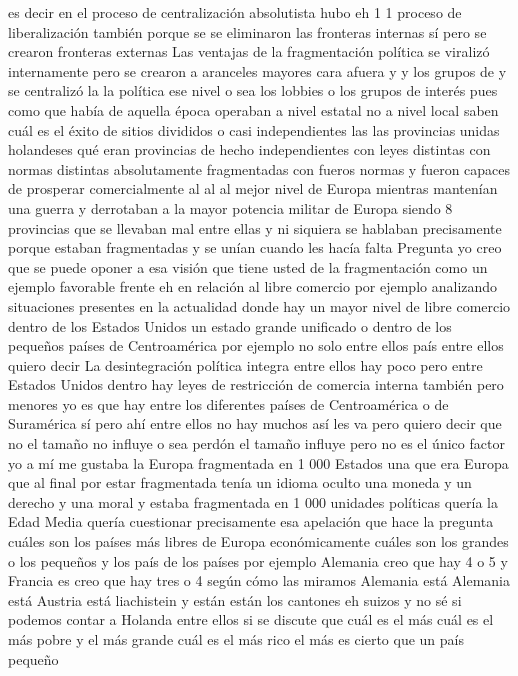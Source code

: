 es decir en el proceso de centralización absolutista hubo eh 1 1 proceso de liberalización también
porque se se eliminaron las fronteras internas sí pero se crearon fronteras externas
Las ventajas de la fragmentación política
se viralizó internamente pero se crearon a aranceles mayores cara afuera y y los grupos de y se centralizó la la política
ese nivel o sea los lobbies o los grupos de interés pues como que había de aquella época operaban a nivel estatal no a nivel local
saben cuál es el éxito de sitios divididos o casi independientes las las provincias unidas holandeses
qué eran provincias de hecho independientes con leyes distintas con normas distintas
absolutamente fragmentadas con fueros normas y fueron capaces de prosperar comercialmente al al al mejor nivel de Europa
mientras mantenían una guerra y derrotaban a la mayor potencia militar de Europa siendo 8 provincias que se llevaban mal entre ellas
y ni siquiera se hablaban precisamente porque estaban fragmentadas y se unían cuando les hacía falta
Pregunta
yo creo que se puede oponer a esa visión que tiene usted de la fragmentación como
un ejemplo favorable frente eh en relación al libre comercio por ejemplo analizando situaciones presentes en la actualidad
donde hay un mayor nivel de libre comercio dentro de los Estados Unidos un estado grande unificado o dentro de los pequeños países de Centroamérica
por ejemplo no solo entre ellos país entre ellos quiero decir
La desintegración política integra
entre ellos hay poco pero entre Estados Unidos dentro hay leyes de restricción de comercia interna también
pero menores yo es que hay entre los diferentes países de Centroamérica o de Suramérica sí
pero ahí entre ellos no hay muchos así les va pero quiero decir que no
el tamaño no influye o sea perdón el tamaño influye pero no es el único factor
yo a mí me gustaba la Europa fragmentada en 1 000 Estados una que era Europa que al final por estar fragmentada tenía un idioma oculto
una moneda y un derecho y una moral y estaba fragmentada en 1 000 unidades políticas
quería la Edad Media quería cuestionar precisamente esa apelación que hace la pregunta cuáles son los países más libres de Europa
económicamente cuáles son los grandes o los pequeños y los país de los países por ejemplo Alemania creo que hay 4 o 5
y Francia es creo que hay tres o 4 según cómo las miramos Alemania está Alemania está Austria está liachistein
y están están los cantones eh suizos y no sé si podemos contar a Holanda entre ellos
si se discute que cuál es el más cuál es el más pobre y el más grande cuál es el más rico el más es cierto que un país pequeño
